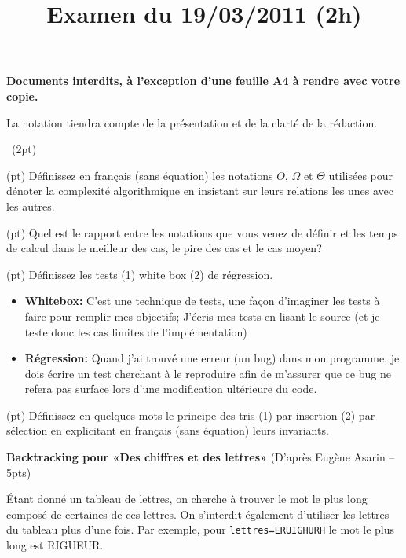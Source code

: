 \documentclass[10pt]{article}\usepackage[correction,nu]{esial}
\begin{document}
\title{Examen du 19/03/2011 (2h)}
\maketitle

\begin{centering}
  \textbf{\large Documents interdits, à l'exception d'une feuille A4 à rendre
    avec votre copie.}

\end{centering}
\centerline{La notation tiendra compte de la présentation et de la clarté de
  la rédaction.}
\bigskip



\bigskip\QuestionCours~(2pt)

\Question(\textonehalf pt) Définissez en français (sans équation) les notations
$O$, $\Omega$ et $\Theta$ utilisées pour dénoter la complexité algorithmique en
insistant sur leurs relations les unes avec les autres.

\Question(\textonehalf pt) Quel est le rapport entre les notations que vous venez de définir et
les temps de calcul dans le meilleur des cas, le pire des cas et le cas moyen? 

\Question(\textonehalf pt) Définissez les tests (1) white box (2) de régression.

\begin{Reponse}
  \begin{itemize}
  \item \textbf{Whitebox:} C'est une technique de tests, une façon d'imaginer
    les tests à faire pour remplir mes objectifs; J'écris mes tests en lisant
    le source (et je teste donc les cas limites de l'implémentation)
  \item \textbf{Régression:} Quand j'ai trouvé une erreur (un bug) dans mon
    programme, je dois écrire un test cherchant à le reproduire afin de
    m'assurer que ce bug ne refera pas surface lors d'une modification
    ultérieure du code. 
  \end{itemize}
\end{Reponse}

\Question(\textonehalf pt) Définissez en quelques mots le principe des tris (1)
par insertion (2) par sélection en explicitant en français (sans équation)
leurs invariants.

\Exercice\textbf{Backtracking pour «Des chiffres et des lettres»} (D'après Eugène
Asarin -- 5pts)

Étant donné un tableau de lettres, on cherche à trouver le mot le plus long
composé de certaines de ces lettres. On s'interdit également d'utiliser les
lettres du tableau plus d'une fois. Par exemple, pour
\texttt{lettres=ERUIGHURH} le mot le plus long est RIGUEUR.
\end{document}
